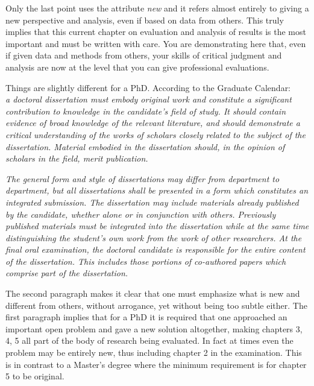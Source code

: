 Only the last point uses the attribute \textit{new} and it refers almost entirely to giving a new perspective and analysis, even if based on data from others. This truly implies that this current chapter on evaluation and analysis of results is the most important and must be written with care. You are demonstrating here that, even if given data and methods from others, your skills of critical judgment and analysis are now at the level that you can give professional evaluations.

Things are slightly different for a PhD. According to the Graduate Calendar: \\ 
\textit{a doctoral dissertation must embody original work and constitute a significant contribution to knowledge in the candidate's field of study. It should contain evidence of broad knowledge of the relevant literature, and should demonstrate a critical understanding of the works of scholars closely related to the subject of the dissertation. Material embodied in the dissertation should, in the opinion of scholars in the field, merit publication.}

\textit{The general form and style of dissertations may differ from department to department, but all dissertations shall be presented in a form which constitutes an integrated submission. The dissertation may include materials already published by the candidate, whether alone or in conjunction with others. Previously published materials must be integrated into the dissertation while at the same time distinguishing the student's own work from the work of other researchers. At the final oral examination, the doctoral candidate is responsible for the entire content of the dissertation. This includes those portions of co-authored papers which comprise part of the dissertation.}

The second paragraph makes it clear that one must emphasize what is new and different from others, without arrogance, yet without being too subtle either. The first paragraph implies that for a PhD it is required that one approached an important open problem and gave a new solution altogether, making chapters 3, 4, 5 all part of the body of research being evaluated. In fact at times even the problem may be entirely new, thus including chapter 2 in the examination. This is in contrast to a Master's degree where the minimum requirement is for chapter 5 to be original.



